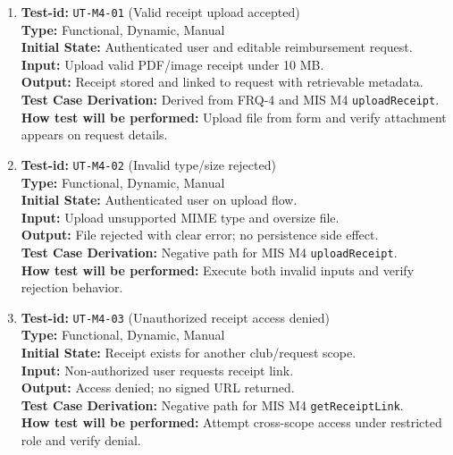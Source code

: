\documentclass[12pt, titlepage]{article}
\begin{document}
\begin{enumerate}

\item \textbf{Test-id:} \texttt{UT-M4-01} (Valid receipt upload accepted)\\
\textbf{Type:} Functional, Dynamic, Manual\\
\textbf{Initial State:} Authenticated user and editable reimbursement request.\\
\textbf{Input:} Upload valid PDF/image receipt under 10 MB.\\
\textbf{Output:} Receipt stored and linked to request with retrievable metadata.\\
\textbf{Test Case Derivation:} Derived from FRQ-4 and MIS M4 \texttt{uploadReceipt}.\\
\textbf{How test will be performed:} Upload file from form and verify attachment appears on request details.

\item \textbf{Test-id:} \texttt{UT-M4-02} (Invalid type/size rejected)\\
\textbf{Type:} Functional, Dynamic, Manual\\
\textbf{Initial State:} Authenticated user on upload flow.\\
\textbf{Input:} Upload unsupported MIME type and oversize file.\\
\textbf{Output:} File rejected with clear error; no persistence side effect.\\
\textbf{Test Case Derivation:} Negative path for MIS M4 \texttt{uploadReceipt}.\\
\textbf{How test will be performed:} Execute both invalid inputs and verify rejection behavior.

\item \textbf{Test-id:} \texttt{UT-M4-03} (Unauthorized receipt access denied)\\
\textbf{Type:} Functional, Dynamic, Manual\\
\textbf{Initial State:} Receipt exists for another club/request scope.\\
\textbf{Input:} Non-authorized user requests receipt link.\\
\textbf{Output:} Access denied; no signed URL returned.\\
\textbf{Test Case Derivation:} Negative path for MIS M4 \texttt{getReceiptLink}.\\
\textbf{How test will be performed:} Attempt cross-scope access under restricted role and verify denial.

\end{enumerate}
\end{document}
